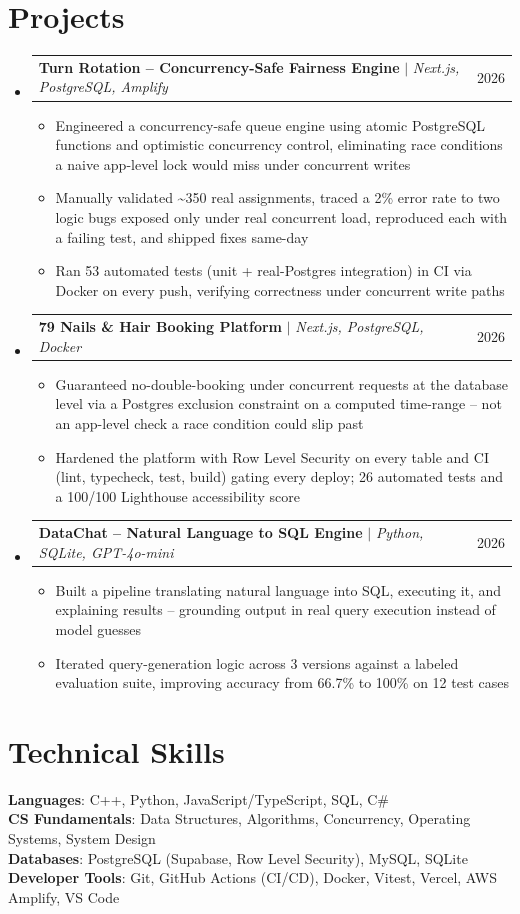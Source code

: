 \documentclass[letterpaper,11pt]{article}
\makeatletter
\newcommand{\resumeItem}[1]{
  \item\small{
    {#1 \vspace{-2pt}}
  }
}
\newcommand{\resumeProjectHeading}[2]{
    \item
    \begin{tabular*}{0.97\textwidth}{l@{\extracolsep{\fill}}r}
      \small#1 & #2 \\
    \end{tabular*}\vspace{-7pt}
}
\newcommand{\resumeSubHeadingListStart}{\begin{itemize}[leftmargin=0.15in, label={}]}
\newcommand{\resumeSubHeadingListEnd}{\end{itemize}}
\newcommand{\resumeItemListStart}{\begin{itemize}}
\newcommand{\resumeItemListEnd}{\end{itemize}\vspace{-5pt}}
\makeatother
\begin{document}
\section{Projects}
    \resumeSubHeadingListStart
      \resumeProjectHeading
          {\textbf{Turn Rotation -- Concurrency-Safe Fairness Engine} $|$ \emph{Next.js, PostgreSQL, Amplify}}{2026}
          \resumeItemListStart
            \resumeItem{Engineered a concurrency-safe queue engine using atomic PostgreSQL functions and optimistic concurrency control, eliminating race conditions a naive app-level lock would miss under concurrent writes}
            \resumeItem{Manually validated \textasciitilde350 real assignments, traced a 2\% error rate to two logic bugs exposed only under real concurrent load, reproduced each with a failing test, and shipped fixes same-day}
            \resumeItem{Ran 53 automated tests (unit + real-Postgres integration) in CI via Docker on every push, verifying correctness under concurrent write paths}
          \resumeItemListEnd
      \resumeProjectHeading
          {\textbf{79 Nails \& Hair Booking Platform} $|$ \emph{Next.js, PostgreSQL, Docker}}{2026}
          \resumeItemListStart
            \resumeItem{Guaranteed no-double-booking under concurrent requests at the database level via a Postgres exclusion constraint on a computed time-range -- not an app-level check a race condition could slip past}
            \resumeItem{Hardened the platform with Row Level Security on every table and CI (lint, typecheck, test, build) gating every deploy; 26 automated tests and a 100/100 Lighthouse accessibility score}
          \resumeItemListEnd
      \resumeProjectHeading
          {\textbf{DataChat -- Natural Language to SQL Engine} $|$ \emph{Python, SQLite, GPT-4o-mini}}{2026}
          \resumeItemListStart
            \resumeItem{Built a pipeline translating natural language into SQL, executing it, and explaining results -- grounding output in real query execution instead of model guesses}
            \resumeItem{Iterated query-generation logic across 3 versions against a labeled evaluation suite, improving accuracy from 66.7\% to 100\% on 12 test cases}
          \resumeItemListEnd
    \resumeSubHeadingListEnd


\section{Technical Skills}
 \begin{itemize}[leftmargin=0.15in, label={}]
    \small{\item{
     \textbf{Languages}{: C++, Python, JavaScript/TypeScript, SQL, C\#} \\
     \textbf{CS Fundamentals}{: Data Structures, Algorithms, Concurrency, Operating Systems, System Design} \\
     \textbf{Databases}{: PostgreSQL (Supabase, Row Level Security), MySQL, SQLite} \\
     \textbf{Developer Tools}{: Git, GitHub Actions (CI/CD), Docker, Vitest, Vercel, AWS Amplify, VS Code}
    }}
 \end{itemize}


\end{document}
